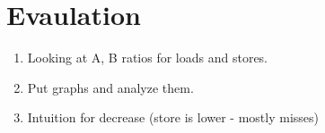 \section{Evaulation}
\label{sec-evaluation}

\begin{enumerate}
  \item Looking at A, B ratios for loads and stores.
  \item Put graphs and analyze them.
  \item Intuition for decrease (store is lower - mostly misses)
\end{enumerate}


